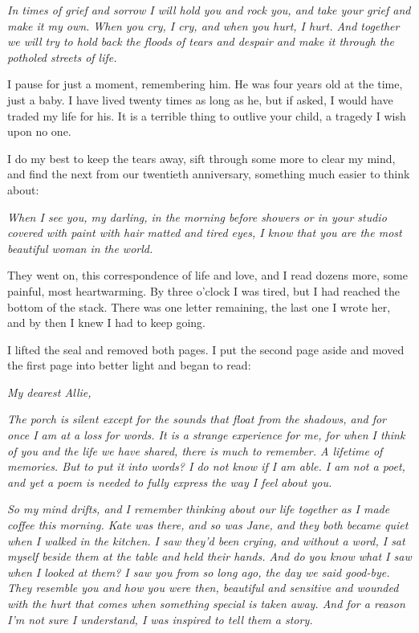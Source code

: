 \documentclass[10pt, twoside, openright]{book}
\begin{document}
\emph{In times of grief and sorrow I will hold you and rock you, and
take your grief and make it my own. When you cry, I cry, and when you
hurt, I hurt. And together we will try to hold back the floods of tears
and despair and make it through the potholed streets of life.}


I pause for just a moment, remembering him. He was four years old at the
time, just a baby. I have lived twenty times as long as he, but if
asked, I would have traded my life for his. It is a terrible thing to
outlive your child, a tragedy I wish upon no one.

I do my best to keep the tears away, sift through some more to clear my
mind, and find the next from our twentieth anniversary, something much
easier to think about:


\emph{When I see you, my darling, in the morning before showers or in
your studio covered with paint with hair matted and tired eyes, I know
that you are the most beautiful woman in the world.}


They went on, this correspondence of life and love, and I read dozens
more, some painful, most heartwarming. By three o'clock I was tired, but
I had reached the bottom of the stack. There was one letter remaining,
the last one I wrote her, and by then I knew I had to keep going.

I lifted the seal and removed both pages. I put the second page aside
and moved the first page into better light and began to read:


\emph{My dearest Allie,}

\emph{The porch is silent except for the sounds that float from the
shadows, and for once I am at a loss for words. It is a strange
experience for me, for when I think of you and the life we have shared,
there is much to remember. A lifetime of memories. But to put it into
words? I do not know if I am able. I am not a poet, and yet a poem is
needed to fully express the way I feel about you.}

\emph{So my mind drifts, and I remember thinking about our life together
as I made coffee this morning. Kate was there, and so was Jane, and they
both became quiet when I walked in the kitchen. I saw they'd been
crying, and without a word, I sat myself beside them at the table and
held their hands. And do you know what I saw when I looked at them? I
saw you from so long ago, the day we said good-bye. They resemble you
and how you were then, beautiful and sensitive and wounded with the hurt
that comes when something special is taken away. And for a reason I'm
not sure I understand, I was inspired to tell them a story.}
\end{document}
